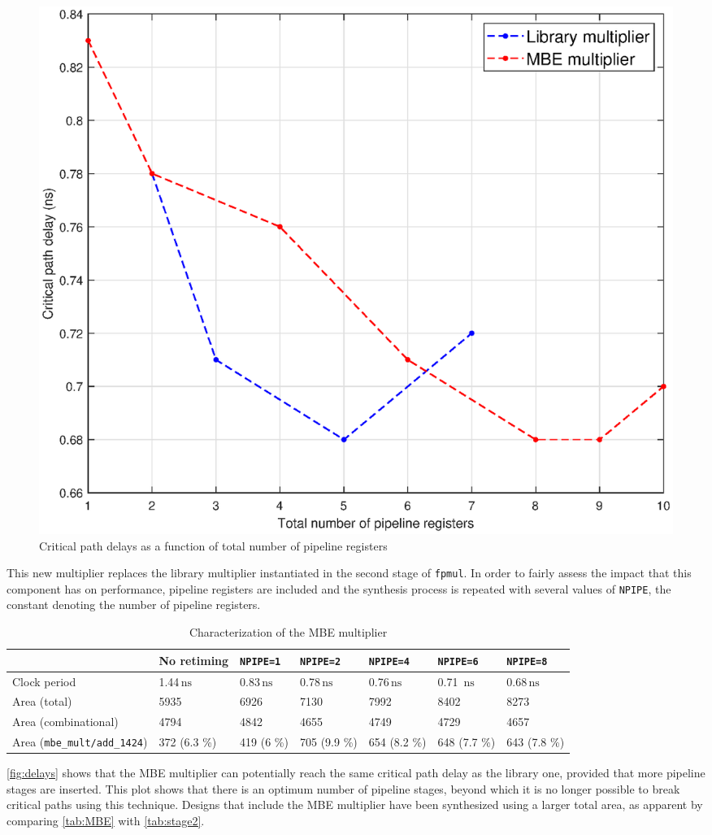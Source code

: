 \begin{figure}
	\includegraphics[width=\textwidth]{chapter2/images/delays.eps}
	\caption{Critical path delays as a function of total number of pipeline registers}
	\label{fig:delays}
\end{figure}
This new multiplier replaces the library multiplier instantiated in the second stage of \texttt{fpmul}. In order to fairly assess the impact that this component has on performance, pipeline registers are included and the synthesis process is repeated with several values of \texttt{NPIPE}, the constant denoting the number of pipeline registers.
\begin{table}
\begin{tabular}{|l|l|l|l|l|l|l|}\hline
	& No retiming & \texttt{NPIPE=1} & \texttt{NPIPE=2} & \texttt{NPIPE=4} & \texttt{NPIPE=6} & \texttt{NPIPE=8}\\\hline
	Clock period & 1.44$\,\textrm{ns}$ & 0.83$\,\textrm{ns}$& 0.78$\,\textrm{ns}$& 0.76$\,\textrm{ns}$ & 0.71 $\,\textrm{ns}$& 0.68$\,\textrm{ns}$ \\\hline
	Area (total) & 5935 & 6926 & 7130 & 7992 & 8402 & 8273 \\\hline
	Area (combinational) & 4794 & 4842 & 4655 & 4749 & 4729 & 4657 \\\hline
	Area (\texttt{mbe\_mult/add\_1424}) & 372 (6.3 \%)  & 419 (6 \%)  &  705 (9.9 \%)& 654 (8.2 \%) & 648 (7.7 \%) & 643 (7.8 \%)\\\hline
\end{tabular}
\caption{Characterization of the MBE multiplier}
\label{tab:MBE}
\end{table}
\autoref{fig:delays} shows that the MBE multiplier can potentially reach the same critical path delay as the library one, provided that more pipeline stages are inserted. This plot shows that there is an optimum number of pipeline stages, beyond which it is no longer possible to break critical paths using this technique. Designs that include the MBE multiplier have been synthesized using a larger total area, as apparent by comparing \autoref{tab:MBE} with \autoref{tab:stage2}.
